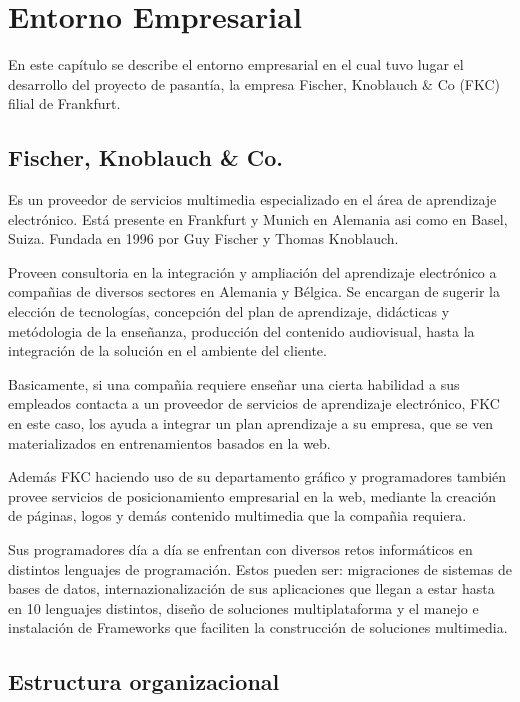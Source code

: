 \chapter{Entorno Empresarial}
\thispagestyle{empty} %

En este capítulo se describe el entorno empresarial en el cual tuvo lugar el desarrollo del proyecto de pasantía, la empresa Fischer, Knoblauch \& Co (FKC) filial de Frankfurt.
\section{Fischer, Knoblauch \& Co.}

Es un proveedor de servicios multimedia especializado en el área de aprendizaje electrónico. Está presente en Frankfurt y Munich en Alemania asi como en Basel, Suiza. Fundada en 1996 por Guy Fischer y Thomas Knoblauch.

Proveen consultoria en la integración y ampliación del aprendizaje electrónico a compañias de diversos sectores en Alemania y Bélgica. Se encargan de sugerir la elección de tecnologías, concepción del plan de aprendizaje, didácticas y metódologia de la enseñanza, producción del contenido audiovisual, hasta la integración de la solución en el ambiente del cliente. 

Basicamente, si una compañia requiere enseñar una cierta habilidad a sus empleados contacta a un proveedor de servicios de aprendizaje electrónico, FKC en este caso, los ayuda a integrar un plan aprendizaje a su empresa, que se ven materializados en entrenamientos basados en la web. 

Además FKC haciendo uso de su departamento gráfico y programadores también provee servicios de posicionamiento empresarial en la web, mediante la creación de páginas, logos y demás contenido multimedia que la compañia requiera. 

Sus programadores día a día se enfrentan con diversos retos informáticos en distintos lenguajes de programación. Estos pueden ser: migraciones de sistemas de bases de datos, internazionalización de sus aplicaciones que llegan a estar hasta en 10 lenguajes distintos, diseño de soluciones multiplataforma y el manejo e instalación de Frameworks que faciliten la construcción de soluciones multimedia.

\section{Estructura organizacional}

